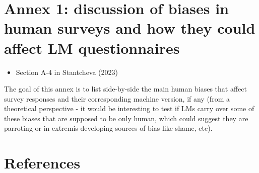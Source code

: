 \documentclass[
]{article}
\providecommand{\tightlist}{%
  \setlength{\itemsep}{0pt}\setlength{\parskip}{0pt}}\usepackage{longtable,booktabs,array}
\begin{document}
\hypertarget{annex-1-discussion-of-biases-in-human-surveys-and-how-they-could-affect-lm-questionnaires}{%
\section{Annex 1: discussion of biases in human surveys and how they
could affect LM
questionnaires}\label{annex-1-discussion-of-biases-in-human-surveys-and-how-they-could-affect-lm-questionnaires}}

\begin{itemize}
\tightlist
\item
  Section A-4 in Stantcheva (2023)
\end{itemize}

The goal of this annex is to list side-by-side the main human biases
that affect survey responses and their corresponding machine version, if
any (from a theoretical perspective - it would be interesting to test if
LMs carry over some of these biases that are supposed to be only human,
which could suggest they are parroting or in extremis developing sources
of bias like shame, etc).

\hypertarget{references}{%
\section*{References}\label{references}}
\end{document}
